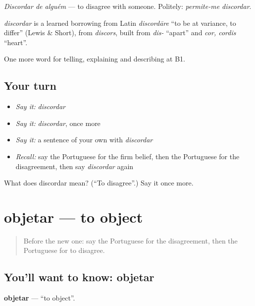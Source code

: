 \emph{Discordar de alguém} — to disagree with someone. Politely: \emph{permite-me discordar}.

\begin{cousinweb}
\emph{discordar} is a learned borrowing from Latin \emph{discordāre} \textquotedblleft{}to be at variance, to differ\textquotedblright{} (Lewis \& Short), from \emph{discors}, built from \emph{dis-} \textquotedblleft{}apart\textquotedblright{} and \emph{cor, cordis} \textquotedblleft{}heart\textquotedblright{}.
\end{cousinweb}

\begin{grammarlens}[title={What you've built}]
One more word for telling, explaining and describing at B1.
\end{grammarlens}

\subsection*{Your turn}
\begin{itemize}
\raggedright
  \item \emph{Say it:} \emph{discordar}
  \item \emph{Say it:} \emph{discordar}, once more
  \item \emph{Say it:} a sentence of your own with \emph{discordar}
  \item \emph{Recall:} say the Portuguese for the firm belief, then the Portuguese for the disagreement, then say \emph{discordar} again
\end{itemize}

\begin{tcolorbox}[breakable,colback=teal!4,colframe=teal!35!black,title={Before you move on}]
What does discordar mean? (\textquotedblleft{}To disagree\textquotedblright{}.) Say it once more.
\end{tcolorbox}
\section[objetar]{objetar — to object}

\label{lesson:PT-C338-objetar}



\begin{quote}
Before the new one: say the Portuguese for the disagreement, then the Portuguese for to disagree.
\end{quote}

\subsection*{You'll want to know: objetar}
\textbf{objetar} — \textquotedblleft{}to object\textquotedblright{}.

